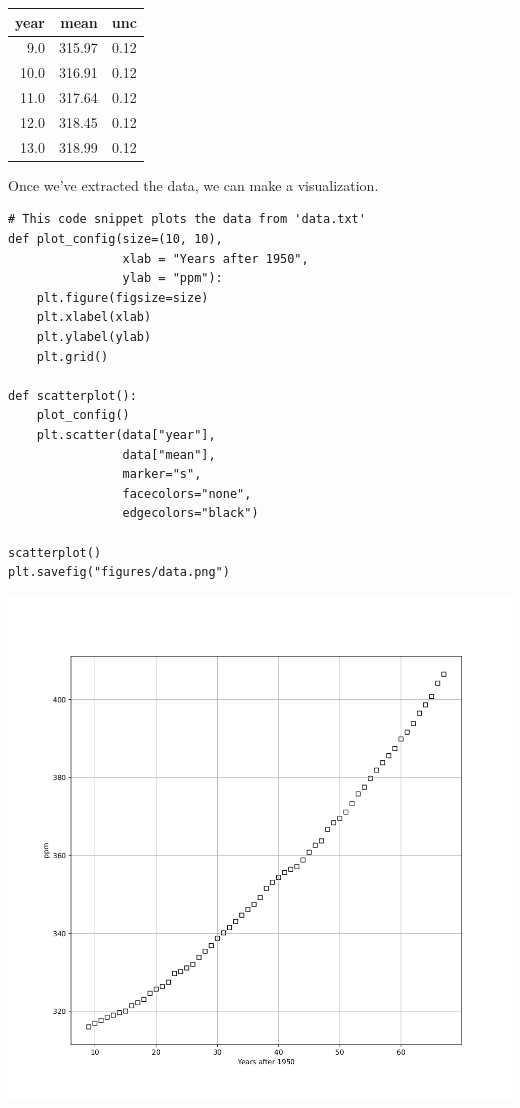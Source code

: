 \documentclass[11pt]{article}
\begin{document}
\begin{center}
\begin{tabular}{rrr}
year & mean & unc\\
\hline
9.0 & 315.97 & 0.12\\
10.0 & 316.91 & 0.12\\
11.0 & 317.64 & 0.12\\
12.0 & 318.45 & 0.12\\
13.0 & 318.99 & 0.12\\
\end{tabular}
\end{center}

Once we've extracted the data, we can make a visualization.

\begin{verbatim}
# This code snippet plots the data from 'data.txt'
def plot_config(size=(10, 10),
                xlab = "Years after 1950",
                ylab = "ppm"):
    plt.figure(figsize=size)
    plt.xlabel(xlab)
    plt.ylabel(ylab)
    plt.grid()

def scatterplot():
    plot_config()
    plt.scatter(data["year"],
                data["mean"],
                marker="s",
                facecolors="none",
                edgecolors="black")

scatterplot()
plt.savefig("figures/data.png")
\end{verbatim}

\begin{center}
\includegraphics[width=.9\linewidth]{./figures/data.png}
\end{center}
\end{document}
